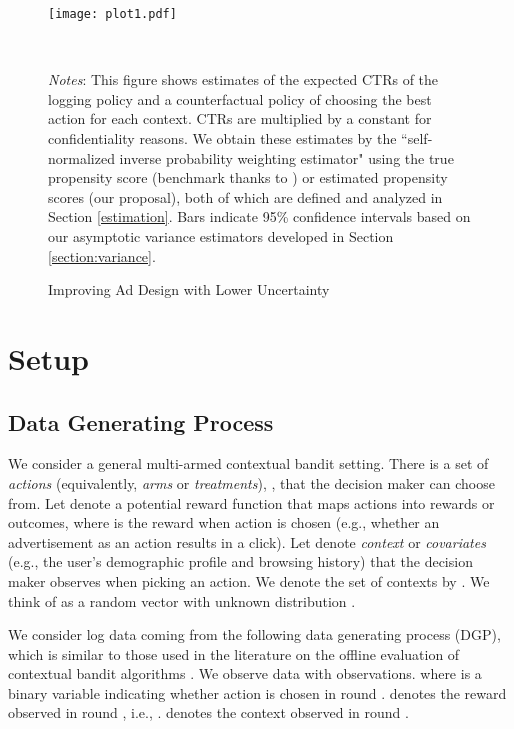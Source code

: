 \documentclass[letterpaper]{article} \usepackage{aaai19}  \usepackage{times}  \usepackage{helvet}  \usepackage{courier}  \usepackage{url}  \usepackage{graphicx}  \frenchspacing  \usepackage{comment}
\newcommand{\citet}[1]
{\citeauthor{#1} \shortcite{#1}}
\newcommand{\citep}{\cite}
\begin{document}
\begin{figure}
\begin{center}
 \texttt{[image: plot1.pdf]}
\end{center}
\caption{Improving Ad Design with Lower Uncertainty}\label{figure}\par
~\par
         \fontsize{9.0pt}{10.0pt}\selectfont \textit{Notes}: This figure shows estimates of the expected CTRs of the logging policy and a counterfactual policy of choosing the best action for each context. 
         CTRs are multiplied by a constant for confidentiality reasons. 
         We obtain these estimates by the ``self-normalized inverse probability weighting estimator" using the true propensity score (benchmark thanks to \citet{Swaminathan2015b}) or estimated propensity scores (our proposal), both of which are defined and analyzed in Section \ref{estimation}. 
         Bars indicate 95\% confidence intervals based on our asymptotic variance estimators developed in Section \ref{section:variance}.
\end{figure} 




\section{Setup}\label{model}

\subsection{Data Generating Process}\label{dgp}

We consider a general multi-armed contextual bandit setting. 
There is a set of  \textit{actions} (equivalently, \textit{arms} or \textit{treatments}), , that the decision maker can choose from.
Let  denote a potential reward function that maps actions into rewards or outcomes, where  is the reward when action  is chosen (e.g., whether an advertisement as an action results in a click).
Let  denote \textit{context} or \textit{covariates} (e.g., the user's demographic profile and browsing history) that the decision maker observes when picking an action. 
We denote the set of contexts by .
We think of  as a random vector with unknown distribution .

We consider log data coming from the following data generating process (DGP), which is similar to those used in the literature on the offline evaluation of contextual bandit algorithms \citep{li2010contextual,Strehl2010,li2011unbiased,Li2012,Swaminathan2015,Swaminathan2015b,swaminathan2017off}.
We observe data  with  observations. 
 where  is a binary variable indicating whether action  is chosen in round . 
 denotes the reward observed in round , i.e., . 
 denotes the context observed in round .
\end{document}
